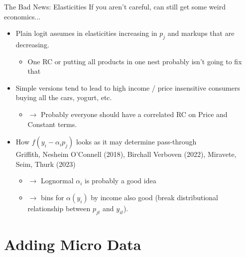 \begin{frame}{The Bad News: Elasticities}
If you aren't careful, can still get some weird economics...
\begin{itemize}
\item Plain logit assumes in \alert{elasticities increasing in $p_j$} and \alert{markups that are decreasing}.\\
\begin{itemize}
\item One RC or putting all products in one nest probably isn't going to fix that
\end{itemize}
\item Simple versions tend to lead to \alert{high income} / \alert{price insensitive} consumers buying all the cars, yogurt, etc.
\begin{itemize}
\item $\rightarrow$ Probably everyone should have a \alert{correlated} RC on Price and Constant terms.
\end{itemize}

\item How $f(y_i - \alpha_i p_j)$ looks as it may determine \alert{pass-through}
\\
Griffith, Nesheim O'Connell (2018), Birchall Verboven (2022), Miravete, Seim, Thurk (2023)
\begin{itemize}
\item $\rightarrow$ Lognormal $\alpha_i$ is probably a good idea
\item $\rightarrow$ bins for $\alpha(y_i)$ by income also good (break distributional relationship between $p_{jt}$ and $y_{it}$).
\end{itemize}

\end{itemize}
\end{frame}

\section*{Adding Micro Data}


